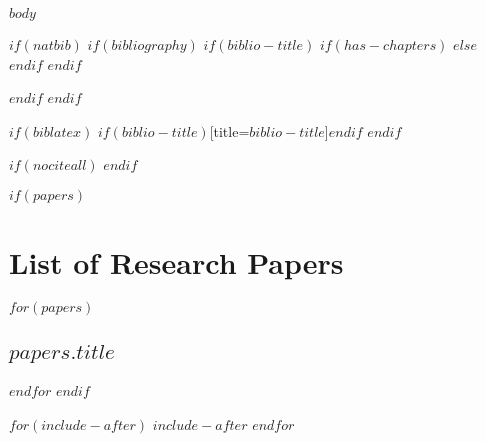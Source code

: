 \documentclass[11pt,twoside,openright,titlepage,
  headinclude,footinclude,BCOR=5mm,
  numbers=noenddot,cleardoublepage=empty,
  tablecaptionabove, dottedtoc,
  bibliography=totoc]{scrreprt}
\begin{document}
\cleardoublepage



$body$

$if(natbib)$
$if(bibliography)$
$if(biblio-title)$
$if(has-chapters)$
  \renewcommand\bibname{$biblio-title$}
$else$
  \renewcommand\refname{$biblio-title$}
$endif$ %
$endif$ %
  
$endif$ %
$endif$ %

$if(biblatex)$
\printbibliography$if(biblio-title)$[title=$biblio-title$]$endif$
$endif$ %

$if(nociteall)$
\nocite{*}
$endif$

\appendix
$if(papers)$
\part*{List of Research Papers}
$for(papers)$
\par\chapter{$papers.title$}
\cleardoublepage

%
$endfor$
$endif$

$for(include-after)$
$include-after$
$endfor$
\end{document}
